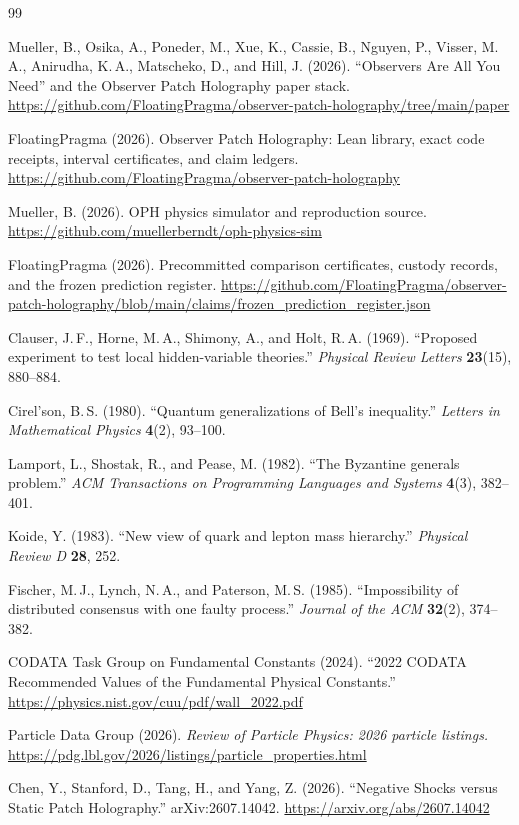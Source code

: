 \documentclass[11pt]{article}
\theoremstyle{remark}
\begin{document}
\begin{thebibliography}{99}

Mueller, B., Osika, A., Poneder, M., Xue, K., Cassie, B., Nguyen, P.,
Visser, M.\,A., Anirudha, K.\,A., Matscheko, D., and Hill, J. (2026).
``Observers Are All You Need'' and the Observer Patch Holography paper
stack.
\url{https://github.com/FloatingPragma/observer-patch-holography/tree/main/paper}

FloatingPragma (2026). Observer Patch Holography: Lean library, exact code
receipts, interval certificates, and claim ledgers.
\url{https://github.com/FloatingPragma/observer-patch-holography}

Mueller, B. (2026). OPH physics simulator and reproduction source.
\url{https://github.com/muellerberndt/oph-physics-sim}

FloatingPragma (2026). Precommitted comparison certificates, custody
records, and the frozen prediction register.
\url{https://github.com/FloatingPragma/observer-patch-holography/blob/main/claims/frozen_prediction_register.json}

Clauser, J.\,F., Horne, M.\,A., Shimony, A., and Holt, R.\,A. (1969).
``Proposed experiment to test local hidden-variable theories.''
\emph{Physical Review Letters} \textbf{23}(15), 880--884.

Cirel'son, B.\,S. (1980). ``Quantum generalizations of Bell's inequality.''
\emph{Letters in Mathematical Physics} \textbf{4}(2), 93--100.

Lamport, L., Shostak, R., and Pease, M. (1982). ``The Byzantine generals
problem.'' \emph{ACM Transactions on Programming Languages and Systems}
\textbf{4}(3), 382--401.

Koide, Y. (1983). ``New view of quark and lepton mass hierarchy.''
\emph{Physical Review D} \textbf{28}, 252.

Fischer, M.\,J., Lynch, N.\,A., and Paterson, M.\,S. (1985).
``Impossibility of distributed consensus with one faulty process.''
\emph{Journal of the ACM} \textbf{32}(2), 374--382.

CODATA Task Group on Fundamental Constants (2024). ``2022 CODATA
Recommended Values of the Fundamental Physical Constants.''
\url{https://physics.nist.gov/cuu/pdf/wall_2022.pdf}

Particle Data Group (2026). \emph{Review of Particle Physics: 2026 particle
listings.}
\url{https://pdg.lbl.gov/2026/listings/particle_properties.html}

Chen, Y., Stanford, D., Tang, H., and Yang, Z. (2026). ``Negative Shocks
versus Static Patch Holography.'' arXiv:2607.14042.
\url{https://arxiv.org/abs/2607.14042}

\end{thebibliography}
\end{document}
